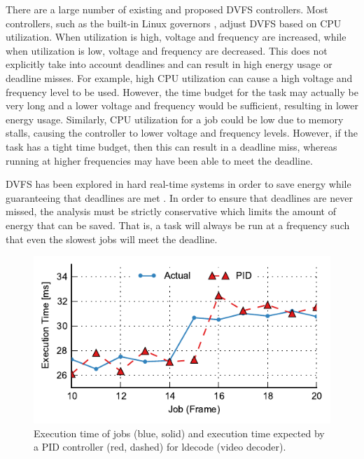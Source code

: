 There are a large number of existing and proposed DVFS controllers. Most
controllers, such as the built-in Linux governors \cite{linux_governors},
adjust DVFS based on CPU utilization. When utilization is high, voltage and
frequency are increased, while when utilization is low, voltage and frequency
are decreased.  This does not explicitly take into account deadlines and can
result in high energy usage or deadline misses. For example, high CPU
utilization can cause a high voltage and frequency level to be used. However,
the time budget for the task may actually be very long and a lower voltage and
frequency would be sufficient, resulting in lower energy usage. Similarly, CPU
utilization for a job could be low due to memory stalls, causing the controller
to lower voltage and frequency levels. However, if the task has a tight time
budget, then this can result in a deadline miss, whereas running at higher
frequencies may have been able to meet the deadline.

DVFS has been explored in hard real-time systems in order to save energy while
guaranteeing that deadlines are met \cite{rtdvfs-systor12}. In order to ensure
that deadlines are never missed, the analysis must be strictly conservative
which limits the amount of energy that can be saved. That is, a task will
always be run at a frequency such that even the slowest jobs will meet the
deadline. 

\begin{figure}
  \begin{center}
    \includegraphics{exec_time_prediction/figs/ldecode_pid.pdf}
    \caption{Execution time of jobs (blue, solid) and execution time
    expected by a PID controller (red, dashed) for ldecode (video decoder).}
    \label{fig:exec_time_prediction.applications.ldecode_pid}
  \end{center}
\end{figure}

